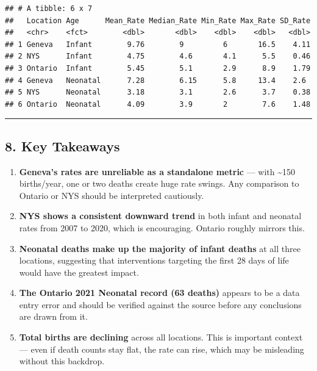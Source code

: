 \documentclass[
]{article}
\begin{document}
\begin{verbatim}
## # A tibble: 6 x 7
##   Location Age      Mean_Rate Median_Rate Min_Rate Max_Rate SD_Rate
##   <chr>    <fct>        <dbl>       <dbl>    <dbl>    <dbl>   <dbl>
## 1 Geneva   Infant        9.76        9         6       16.5    4.11
## 2 NYS      Infant        4.75        4.6       4.1      5.5    0.46
## 3 Ontario  Infant        5.45        5.1       2.9      8.9    1.79
## 4 Geneva   Neonatal      7.28        6.15      5.8     13.4    2.6 
## 5 NYS      Neonatal      3.18        3.1       2.6      3.7    0.38
## 6 Ontario  Neonatal      4.09        3.9       2        7.6    1.48
\end{verbatim}

\begin{center}\rule{0.5\linewidth}{0.5pt}\end{center}

\subsection{8. Key Takeaways}\label{key-takeaways}

\begin{enumerate}
\def\labelenumi{\arabic{enumi}.}
\item
  \textbf{Geneva's rates are unreliable as a standalone metric} --- with
  \textasciitilde150 births/year, one or two deaths create huge rate
  swings. Any comparison to Ontario or NYS should be interpreted
  cautiously.
\item
  \textbf{NYS shows a consistent downward trend} in both infant and
  neonatal rates from 2007 to 2020, which is encouraging. Ontario
  roughly mirrors this.
\item
  \textbf{Neonatal deaths make up the majority of infant deaths} at all
  three locations, suggesting that interventions targeting the first 28
  days of life would have the greatest impact.
\item
  \textbf{The Ontario 2021 Neonatal record (63 deaths)} appears to be a
  data entry error and should be verified against the source before any
  conclusions are drawn from it.
\item
  \textbf{Total births are declining} across all locations. This is
  important context --- even if death counts stay flat, the rate can
  rise, which may be misleading without this backdrop.
\end{enumerate}
\end{document}

